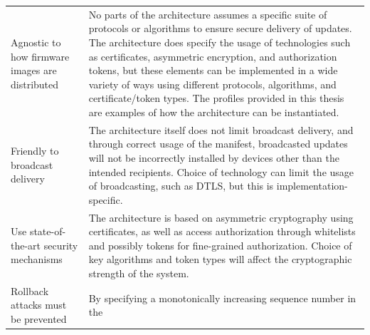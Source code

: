 \documentclass[0-thesis.tex]{subfiles}
\begin{document}
\begin{small}
\begin{longtable}[]{@{}ll@{}}
    \begin{minipage}[t]{0.41\columnwidth}\raggedright\strut
    Agnostic to how firmware images are distributed\strut
    \end{minipage} & \begin{minipage}[t]{0.53\columnwidth}\raggedright\strut
    No parts of the architecture assumes a specific suite of protocols or
    algorithms to ensure secure delivery of updates. The architecture does
    specify the usage of technologies such as certificates, asymmetric
    encryption, and authorization tokens, but these elements can be
    implemented in a wide variety of ways using different protocols,
    algorithms, and certificate/token types. The profiles provided in this
    thesis are examples of how the architecture can be instantiated.\strut
    \end{minipage}\tabularnewline
    \begin{minipage}[t]{0.41\columnwidth}\raggedright\strut
    Friendly to broadcast delivery\strut
    \end{minipage} & \begin{minipage}[t]{0.53\columnwidth}\raggedright\strut
    The architecture itself does not limit broadcast delivery, and through
    correct usage of the manifest, broadcasted updates will not be
    incorrectly installed by devices other than the intended recipients.
    Choice of technology can limit the usage of broadcasting, such as DTLS,
    but this is implementation-specific.\strut
    \end{minipage}\tabularnewline
    \begin{minipage}[t]{0.41\columnwidth}\raggedright\strut
    Use state-of-the-art security mechanisms\strut
    \end{minipage} & \begin{minipage}[t]{0.53\columnwidth}\raggedright\strut
    The architecture is based on asymmetric cryptography using certificates,
    as well as access authorization through whitelists and possibly tokens
    for fine-grained authorization. Choice of key algorithms and token types
    will affect the cryptographic strength of the system.\strut
    \end{minipage}\tabularnewline
    \begin{minipage}[t]{0.41\columnwidth}\raggedright\strut
    Rollback attacks must be prevented\strut
    \end{minipage} & \begin{minipage}[t]{0.53\columnwidth}\raggedright\strut
    By specifying a monotonically increasing sequence number in the

\end{minipage}
\end{longtable}
\end{small}
\end{document}
